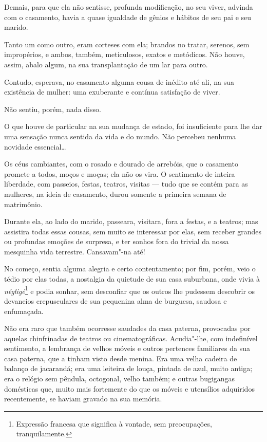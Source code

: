 Demais, para que ela não sentisse, profunda modificação, no seu viver,
advinda com o casamento, havia a quase igualdade de gênios e hábitos de
seu pai e seu marido.

Tanto um como outro, eram corteses com ela; brandos no tratar, serenos,
sem impropérios, e ambos, também, meticulosos, exatos e metódicos. Não
houve, assim, abalo algum, na sua transplantação de um lar para outro.

Contudo, esperava, no casamento alguma cousa de inédito até ali, na sua
existência de mulher: uma exuberante e contínua satisfação de viver.

Não sentiu, porém, nada disso.

O que houve de particular na sua mudança de estado, foi insuficiente
para lhe dar uma sensação nunca sentida da vida e do mundo. Não percebeu
nenhuma novidade essencial\ldots{}

Os céus cambiantes, com o rosado e dourado de arrebóis, que o casamento
promete a todos, moços e moças; ela não os vira. O sentimento de inteira
liberdade, com passeios, festas, teatros, visitas --- tudo que se contém
para as mulheres, na ideia de casamento, durou somente a primeira semana
de matrimônio.

Durante ela, ao lado do marido, passeara, visitara, fora a festas, e a
teatros; mas assistira todas essas cousas, sem muito se interessar por
elas, sem receber grandes ou profundas emoções de surpresa, e ter sonhos
fora do trivial da nossa mesquinha vida terrestre. Cansavam"-na até!

No começo, sentia alguma alegria e certo contentamento; por fim, porém,
veio o tédio por elas todas, a nostalgia da quietude de sua casa
suburbana, onde vivia à \emph{négligé}\footnote{Expressão francesa que
  significa à vontade, sem preocupações, tranquilamente.} e podia
sonhar, sem desconfiar que os outros lhe pudessem descobrir os devaneios
crepusculares de sua pequenina alma de burguesa, saudosa e enfumaçada.

Não era raro que também ocorresse saudades da casa paterna, provocadas
por aquelas chinfrinadas de teatros ou cinematográficas. Acudia"-lhe, com
indefinível sentimento, a lembrança de velhos móveis e outros pertences
familiares da sua casa paterna, que a tinham visto desde menina. Era uma
velha cadeira de balanço de jacarandá; era uma leiteira de louça,
pintada de azul, muito antiga; era o relógio sem pêndula, octogonal,
velho também; e outras bugigangas domésticas que, muito mais fortemente
do que os móveis e utensílios adquiridos recentemente, se haviam gravado
na sua memória.


